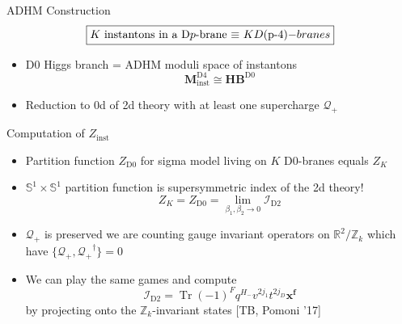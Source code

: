 \documentclass{beamer}
\DeclareMathOperator{\Tr}{Tr}
\begin{document}
\begin{frame}{ADHM Construction}
\begin{equation*}
   \boxed{ \text{$K$ instantons in a D$p$-brane $\equiv$ $K$} D$(p-4)$-branes}
\end{equation*}
    \begin{figure}
  \centering
  
\end{figure}
\begin{itemize}
\item{D$0$ Higgs branch = ADHM moduli space of instantons
\begin{equation*}
    \mathbf{M}^{\text{D}4}_{\text{inst}}\cong\mathbf{HB}^{\text{D}0}
\end{equation*}\text{\color{blue}[Douglas '95] [Witten '95] [Douglas '96]}}
    \item {Reduction to 0d of 2d theory with at least one supercharge $\mathcal{Q}_+$}
\end{itemize}
\end{frame}

\begin{frame}{Computation of $Z_{\text{inst}}$}
\begin{itemize}
    \item {Partition function $Z_{\text{D}0}$ for sigma model living on $K$ D$0$-branes equals $Z_K$}
    \item{$\mathbb{S}^1\times\mathbb{S}^1$ partition function is supersymmetric index of the 2d theory!
        \begin{equation*}
        Z_K=Z_{\text{D}0}=\lim_{\beta_1,\beta_2\to0}\mathcal{I}_{\text{D}2}
    \end{equation*}}
    \item{$\mathcal{Q}_+$ is \alert{preserved} we are counting gauge invariant operators on $\mathbb{R}^2/\mathbb{Z}_k$ which have $\{\mathcal{Q}_+,\mathcal{Q_+}^{\dagger}\}=0$}
    \item{We can play the same games and compute 
        \begin{equation*}
        \mathcal{I}_{\text{D$2$}}=\Tr(-1)^Fq^{H_-}v^{2j_1}t^{2j_D}\mathbf{x}^{\mathbf{f}}
    \end{equation*} by projecting onto the $\mathbb{Z}_k$-invariant states \color{blue}[TB, Pomoni '17]\color{black}}
\end{itemize}
\end{frame}
\end{document}
